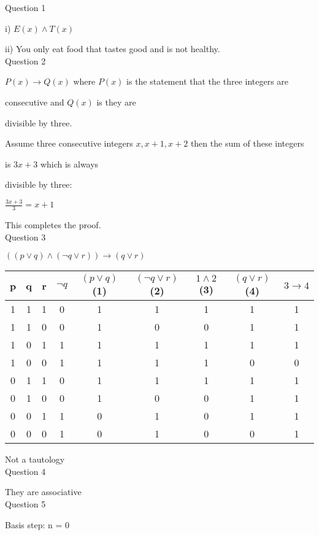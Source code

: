 \documentclass[12]{article}
\begin{document}
Question 1

i) $E(x) \land T(x)$

ii) You only eat food that tastes good and is not healthy.\\

Question 2

$P(x) \rightarrow Q(x)$ where $P(x)$ is the statement that the three integers are 

consecutive and $Q(x)$ is they are 

divisible by three.

Assume three consecutive integers $x, x+1, x+2$ then the sum of these integers 

is $3x+3$ which is always 

divisible by three:

\indent \indent \indent \indent \indent \indent\indent \indent $\displaystyle{\frac{3x+3}{3}} = x+1 $ 

This completes the proof.\\

Question 3

$((p \lor q) \land (\neg q \lor r)) \rightarrow (q \lor r)$

\begin{table}[H]
\begin{tabular}{c c c c c c c c c}
p & q & r & $\lnot q$ & $(p \lor q)$ (1) & $(\neg q \lor r)$ (2) & $1 \land 2$ (3) & $(q \lor r)$ (4)& $3 \rightarrow 4$ \\
\hline
1 & 1 & 1 & 0 & 1 & 1 & 1 & 1 & 1\\
1 & 1 & 0 & 0 & 1 & 0 & 0 & 1 & 1\\
1 & 0 & 1 & 1 & 1 & 1 & 1 & 1 & 1\\
1 & 0 & 0 & 1 & 1 & 1 & 1 & 0 & 0\\
0 & 1 & 1 & 0 & 1 & 1 & 1 & 1 & 1\\
0 & 1 & 0 & 0 & 1 & 0 & 0 & 1 & 1\\
0 & 0 & 1 & 1 & 0 & 1 & 0 & 1 & 1\\
0 & 0 & 0 & 1 & 0 & 1 & 0 & 0 & 1\\
\end{tabular}
\end{table}
Not a tautology\\

Question 4

They are associative \\

Question 5

Basis step: n = 0
\end{document}
